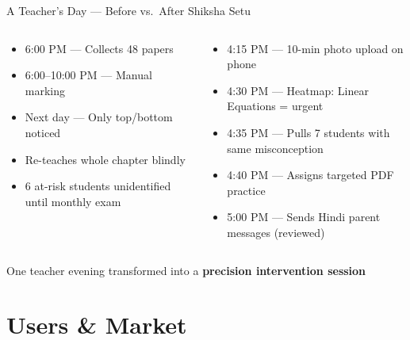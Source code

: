\documentclass[aspectratio=169,10pt]{beamer}
\newcommand{\badge}[2]{%
  \tikz[baseline=(b.base)]{
    \node[fill=#1, text=white, rounded corners=3pt, inner xsep=6pt, inner ysep=2pt,
          font=\scriptsize\bfseries] (b) {#2};
  }%
}
\begin{document}
\begin{frame}{A Teacher's Day — Before vs.\ After Shiksha Setu}
  \footnotesize
  \begin{columns}[T]
    \begin{tcolorbox}[colback=SSRed!6,colframe=SSRed,title=\textbf{Before — Priya, 9th Math}]
      \begin{itemize}\setlength\itemsep{0.12em}
        \item 6:00 PM — Collects 48 papers
        \item 6:00–10:00 PM — Manual marking
        \item Next day — Only top/bottom noticed
        \item Re-teaches whole chapter blindly
        \item 6 at-risk students unidentified until monthly exam
      \end{itemize}
    \end{tcolorbox}

    \begin{tcolorbox}[colback=SSGreen!6,colframe=SSGreen,title=\textbf{After — With Shiksha Setu}]
      \begin{itemize}\setlength\itemsep{0.12em}
        \item 4:15 PM — 10-min photo upload on phone
        \item 4:30 PM — Heatmap: Linear Equations = urgent
        \item 4:35 PM — Pulls 7 students with same misconception
        \item 4:40 PM — Assigns targeted PDF practice
        \item 5:00 PM — Sends Hindi parent messages (reviewed)
      \end{itemize}
    \end{tcolorbox}
  \end{columns}
  \vspace{0.15cm}
  \centering\badge{SSOrange}{Impact} One teacher evening transformed into a \textbf{precision intervention session}
\end{frame}

\section{Users \& Market}
\end{document}
